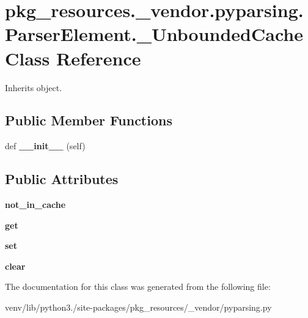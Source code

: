 \hypertarget{classpkg__resources_1_1__vendor_1_1pyparsing_1_1_parser_element_1_1___unbounded_cache}{}\section{pkg\+\_\+resources.\+\_\+vendor.\+pyparsing.\+Parser\+Element.\+\_\+\+Unbounded\+Cache Class Reference}
\label{classpkg__resources_1_1__vendor_1_1pyparsing_1_1_parser_element_1_1___unbounded_cache}


Inherits object.

\subsection*{Public Member Functions}
\begin{DoxyCompactItemize}
\item 
\mbox{\label{classpkg__resources_1_1__vendor_1_1pyparsing_1_1_parser_element_1_1___unbounded_cache_a885a63c42bf61339fe9eadd5c4915f18}} 
def {\bfseries \+\_\+\+\_\+init\+\_\+\+\_\+} (self)
\end{DoxyCompactItemize}
\subsection*{Public Attributes}
\begin{DoxyCompactItemize}
\item 
\mbox{\label{classpkg__resources_1_1__vendor_1_1pyparsing_1_1_parser_element_1_1___unbounded_cache_a843b5e99130ddcf1d13ba8103f600d1c}} 
{\bfseries not\+\_\+in\+\_\+cache}
\item 
\mbox{\label{classpkg__resources_1_1__vendor_1_1pyparsing_1_1_parser_element_1_1___unbounded_cache_ae8177587a51373bc5004f924fb41fcb9}} 
{\bfseries get}
\item 
\mbox{\label{classpkg__resources_1_1__vendor_1_1pyparsing_1_1_parser_element_1_1___unbounded_cache_ab14b775e21d6586cd1862f77238fca18}} 
{\bfseries set}
\item 
\mbox{\label{classpkg__resources_1_1__vendor_1_1pyparsing_1_1_parser_element_1_1___unbounded_cache_af1ae77d5b307c5b656e7f236fc4a11e5}} 
{\bfseries clear}
\end{DoxyCompactItemize}


The documentation for this class was generated from the following file\+:\begin{DoxyCompactItemize}
\item 
venv/lib/python3./site-\/packages/pkg\+\_\+resources/\+\_\+vendor/pyparsing.\+py\end{DoxyCompactItemize}
